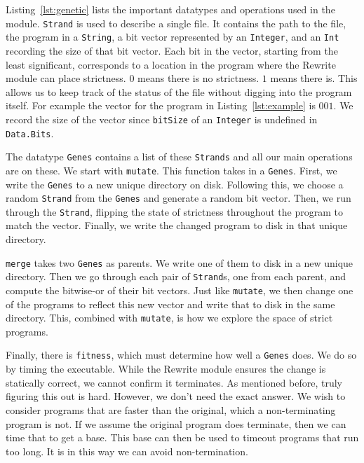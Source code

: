 \documentclass{sigplanconf}
\begin{document}
Listing~\ref{lst:genetic} lists the important datatypes and operations used in the module. \lstinline!Strand! is used to describe a single file. It contains the path to the file, the program in a \lstinline!String!, a bit vector represented by an \lstinline!Integer!, and an \lstinline!Int! recording the size of that bit vector. Each bit in the vector, starting from the least significant, corresponds to a location in the program where the Rewrite module can place strictness. $0$ means there is no strictness. $1$ means there is. This allows us to keep track of the status of the file without digging into the program itself. For example the vector for the program in Listing~\ref{lst:example} is $001$. We record the size of the vector since \lstinline!bitSize! of an \lstinline!Integer! is undefined in \lstinline!Data.Bits!.

The datatype \lstinline!Genes! contains a list of these \lstinline!Strands! and all our main operations are on these. We start with \lstinline!mutate!. This function takes in a \lstinline!Genes!. First, we write the \lstinline!Genes! to a new unique directory on disk. Following this, we choose a random \lstinline!Strand! from the \lstinline!Genes! and generate a random bit vector. Then, we run through the \lstinline!Strand!, flipping the state of strictness throughout the program to match the vector. Finally, we write the changed program to disk in that unique directory.

\lstinline!merge! takes two \lstinline!Genes! as parents. We write one of them to disk in a new unique directory. Then we go through each pair of \lstinline!Strand!s, one from each parent, and compute the bitwise-or of their bit vectors. Just like \lstinline!mutate!, we then change one of the programs to reflect this new vector and write that to disk in the same directory. This, combined with \lstinline!mutate!, is how we explore the space of strict programs.

Finally, there is \lstinline!fitness!, which must determine how well a \lstinline!Genes! does. We do so by timing the executable. While the Rewrite module ensures the change is statically correct, we cannot confirm it terminates. As mentioned before, truly figuring this out is hard. However, we don't need the exact answer. We wish to consider programs that are faster than the original, which a non-terminating program is not. If we assume the original program does terminate, then we can time that to get a base. This base can then be used to timeout programs that run too long. It is in this way we can avoid non-termination.
\end{document}
